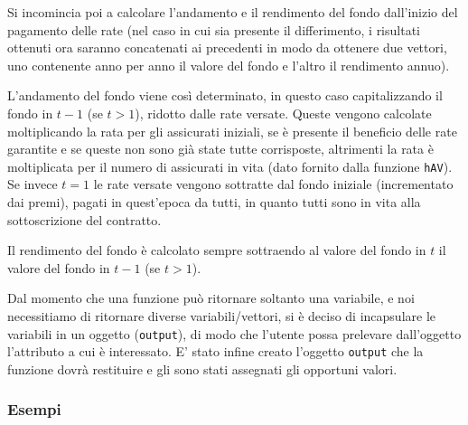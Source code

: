 \documentclass[
]{article}
\newenvironment{Shaded}{\begin{snugshade}}{\end{snugshade}}
\newcommand{\AttributeTok}[1]{\textcolor[rgb]{0.77,0.63,0.00}{#1}}
\newcommand{\ConstantTok}[1]{\textcolor[rgb]{0.00,0.00,0.00}{#1}}
\newcommand{\DecValTok}[1]{\textcolor[rgb]{0.00,0.00,0.81}{#1}}
\newcommand{\FloatTok}[1]{\textcolor[rgb]{0.00,0.00,0.81}{#1}}
\newcommand{\FunctionTok}[1]{\textcolor[rgb]{0.00,0.00,0.00}{#1}}
\newcommand{\NormalTok}[1]{#1}
\newcommand{\OtherTok}[1]{\textcolor[rgb]{0.56,0.35,0.01}{#1}}
\newcommand{\SpecialCharTok}[1]{\textcolor[rgb]{0.00,0.00,0.00}{#1}}
\begin{document}
Si incomincia poi a calcolare l'andamento e il rendimento del fondo
dall'inizio del pagamento delle rate (nel caso in cui sia presente il
differimento, i risultati ottenuti ora saranno concatenati ai precedenti
in modo da ottenere due vettori, uno contenente anno per anno il valore
del fondo e l'altro il rendimento annuo).

L'andamento del fondo viene così determinato, in questo caso
capitalizzando il fondo in \(t-1\) (se \(t>1\)), ridotto dalle rate
versate. Queste vengono calcolate moltiplicando la rata per gli
assicurati iniziali, se è presente il beneficio delle rate garantite e
se queste non sono già state tutte corrisposte, altrimenti la rata è
moltiplicata per il numero di assicurati in vita (dato fornito dalla
funzione \texttt{hAV}). Se invece \(t=1\) le rate versate vengono
sottratte dal fondo iniziale (incrementato dai premi), pagati in
quest'epoca da tutti, in quanto tutti sono in vita alla sottoscrizione
del contratto.

Il rendimento del fondo è calcolato sempre sottraendo al valore del
fondo in \(t\) il valore del fondo in \(t-1\) (se \(t>1\)).

Dal momento che una funzione può ritornare soltanto una variabile, e noi
necessitiamo di ritornare diverse variabili/vettori, si è deciso di
incapsulare le variabili in un oggetto (\texttt{output}), di modo che
l'utente possa prelevare dall'oggetto l'attributo a cui è interessato.
E' stato infine creato l'oggetto \texttt{output} che la funzione dovrà
restituire e gli sono stati assegnati gli opportuni valori.

\hypertarget{esempi}{%
\subsubsection{Esempi}\label{esempi}}

\begin{Shaded}
\end{Shaded}
\end{document}
